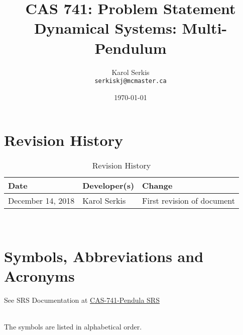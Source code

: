 \documentclass[12pt, titlepage]{article}
\begin{document}
\title{CAS 741: Problem Statement\\[10pt]\Large Dynamical Systems: 
Multi-Pendulum }
\author{Karol Serkis\\\texttt{serkiskj@mcmaster.ca}}

\date{\today}
	
\maketitle


\section{Revision History}

\begin{table}[hp]
\caption{Revision History} \label{TblRevisionHistory}
\begin{tabularx}{\textwidth}{llX}
\toprule
\textbf{Date} & \textbf{Developer(s)} & \textbf{Change}\\
\midrule
December 14, 2018 & Karol Serkis & First revision of document\\
\bottomrule
\end{tabularx}
\end{table}

~\newpage

\section{Symbols, Abbreviations and Acronyms}

See SRS Documentation at 
\href{https://github.com/karolserkis/CAS-741-Pendula
/blob/master/docs/SRS/SRS.pdf}{CAS-741-Pendula SRS}

\\
The symbols are listed in alphabetical order.\\
\end{document}
